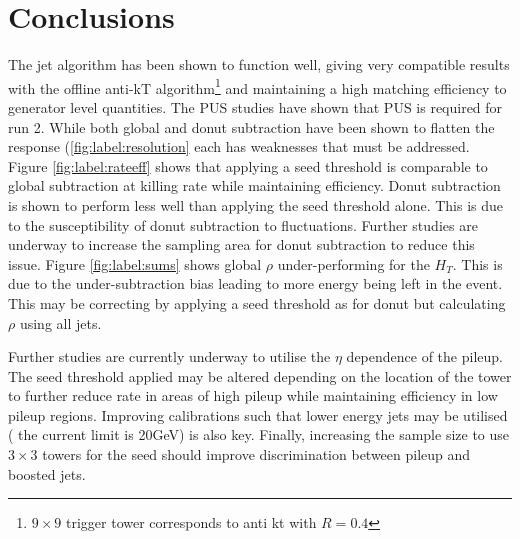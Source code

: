 \section{Conclusions}
The jet algorithm has been shown to function well, giving very compatible results with the offline anti-kT algorithm\footnote{$9\times9$ trigger tower corresponds to anti kt with $R =0.4$} and maintaining a high matching efficiency to generator level quantities. The PUS studies have shown that PUS is required for run 2. While both global and donut subtraction have been shown to flatten the response (\ref{fig:label:resolution} each has weaknesses that must be addressed. Figure \ref{fig:label:rateeff} shows that applying a seed threshold is comparable to global subtraction at killing rate while maintaining efficiency. Donut subtraction is shown to perform less well than applying the seed threshold alone. This is due to the susceptibility of donut subtraction to fluctuations. Further studies are underway to increase the sampling area for donut subtraction to reduce this issue. Figure \ref{fig:label:sums} shows global $\rho$ under-performing for the $H_T$. This is due to the under-subtraction bias leading to more energy being left in the event. This may be correcting by applying a seed threshold as for donut but calculating $\rho$ using all jets. 

Further studies are currently underway to utilise the $\eta$ dependence of the pileup.  The seed threshold applied may be altered depending on the location of the tower to further reduce rate in areas of high pileup while maintaining efficiency in low pileup regions. Improving calibrations such that lower energy jets may be utilised ( the current limit is 20GeV) is also key. Finally, increasing the sample size to use $3\times3$ towers for the seed should improve discrimination between pileup and boosted jets. 

    
